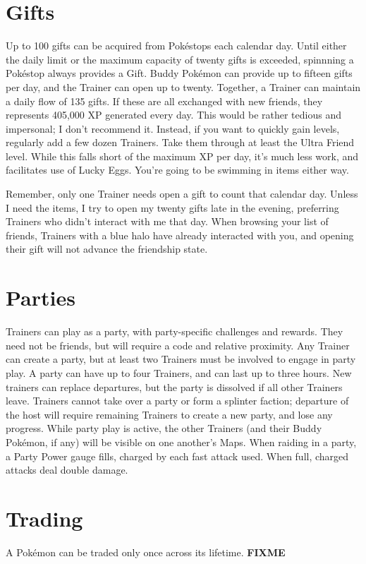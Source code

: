 \section{Gifts}
\label{sec:gifts}
Up to 100 gifts can be acquired from Pokéstops each calendar day.
Until either the daily limit or the maximum capacity of twenty gifts
 is exceeded, spinnning a Pokéstop always provides a Gift.
Buddy Pokémon can provide up to fifteen gifts per day,
  and the Trainer can open up to twenty.
Together, a Trainer can maintain a daily flow of 135 gifts.
If these are all exchanged with new friends, they represents 405,000 XP generated every day.
This would be rather tedious and impersonal; I don't recommend it.
Instead, if you want to quickly gain levels, regularly add a few dozen Trainers.
Take them through at least the Ultra Friend level.
While this falls short of the maximum XP per day, it's much less work, and facilitates use of Lucky Eggs.
You're going to be swimming in items either way.

Remember, only one Trainer needs open a gift to count that calendar day.
Unless I need the items, I try to open my twenty gifts late in the evening,
  preferring Trainers who didn't interact with me that day.
When browsing your list of friends, Trainers with a blue halo have already interacted with you,
  and opening their gift will not advance the friendship state.

\section{Parties}
\label{sec:parties}
Trainers can play as a party, with party-specific challenges and rewards.
They need not be friends, but will require a code and relative proximity.
Any Trainer can create a party, but at least two Trainers must be involved to engage in party play.
A party can have up to four Trainers, and can last up to three hours.
New trainers can replace departures, but the party is dissolved if all other Trainers leave.
Trainers cannot take over a party or form a splinter faction; departure of the host will
  require remaining Trainers to create a new party, and lose any progress.
While party play is active, the other Trainers (and their Buddy Pokémon, if any)
  will be visible on one another's Maps.
When raiding in a party, a Party Power gauge fills, charged by each fast attack used.
When full, charged attacks deal double damage.

\section{Trading}
\label{sec:trades}
A Pokémon can be traded only once across its lifetime.
\textbf{FIXME}

